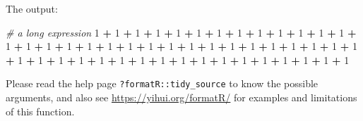 \documentclass[
  11pt,
]{krantz}
\newenvironment{Shaded}{\begin{snugshade}}{\end{snugshade}}
\newcommand{\CommentTok}[1]{\textcolor[rgb]{0.37,0.37,0.37}{\textit{#1}}}
\newcommand{\DecValTok}[1]{\textcolor[rgb]{0.06,0.06,0.06}{#1}}
\newcommand{\OperatorTok}[1]{\textcolor[rgb]{0.43,0.43,0.43}{\textbf{#1}}}
\newcommand{\StringTok}[1]{\textcolor[rgb]{0.5,0.5,0.5}{#1}}
\begin{document}
The output:

\begin{Shaded}
\begin{Highlighting}[]
\CommentTok{# a long expression}
\DecValTok{1} \OperatorTok{+}\StringTok{ }\DecValTok{1} \OperatorTok{+}\StringTok{ }\DecValTok{1} \OperatorTok{+}\StringTok{ }\DecValTok{1} \OperatorTok{+}\StringTok{ }\DecValTok{1} \OperatorTok{+}\StringTok{ }\DecValTok{1} \OperatorTok{+}\StringTok{ }\DecValTok{1} \OperatorTok{+}\StringTok{ }\DecValTok{1} \OperatorTok{+}\StringTok{ }\DecValTok{1} \OperatorTok{+}\StringTok{ }\DecValTok{1} \OperatorTok{+}\StringTok{ }\DecValTok{1} \OperatorTok{+}\StringTok{ }\DecValTok{1} \OperatorTok{+}\StringTok{ }\DecValTok{1} \OperatorTok{+}\StringTok{ }
\StringTok{  }\DecValTok{1} \OperatorTok{+}\StringTok{ }\DecValTok{1} \OperatorTok{+}\StringTok{ }\DecValTok{1} \OperatorTok{+}\StringTok{ }\DecValTok{1} \OperatorTok{+}\StringTok{ }\DecValTok{1} \OperatorTok{+}\StringTok{ }\DecValTok{1} \OperatorTok{+}\StringTok{ }\DecValTok{1} \OperatorTok{+}\StringTok{ }\DecValTok{1} \OperatorTok{+}\StringTok{ }\DecValTok{1} \OperatorTok{+}\StringTok{ }\DecValTok{1} \OperatorTok{+}\StringTok{ }\DecValTok{1} \OperatorTok{+}\StringTok{ }\DecValTok{1} \OperatorTok{+}\StringTok{ }
\StringTok{  }\DecValTok{1} \OperatorTok{+}\StringTok{ }\DecValTok{1} \OperatorTok{+}\StringTok{ }\DecValTok{1} \OperatorTok{+}\StringTok{ }\DecValTok{1} \OperatorTok{+}\StringTok{ }\DecValTok{1} \OperatorTok{+}\StringTok{ }\DecValTok{1} \OperatorTok{+}\StringTok{ }\DecValTok{1} \OperatorTok{+}\StringTok{ }\DecValTok{1} \OperatorTok{+}\StringTok{ }\DecValTok{1} \OperatorTok{+}\StringTok{ }\DecValTok{1} \OperatorTok{+}\StringTok{ }\DecValTok{1} \OperatorTok{+}\StringTok{ }\DecValTok{1} \OperatorTok{+}\StringTok{ }
\StringTok{  }\DecValTok{1} \OperatorTok{+}\StringTok{ }\DecValTok{1} \OperatorTok{+}\StringTok{ }\DecValTok{1} \OperatorTok{+}\StringTok{ }\DecValTok{1} \OperatorTok{+}\StringTok{ }\DecValTok{1} \OperatorTok{+}\StringTok{ }\DecValTok{1} \OperatorTok{+}\StringTok{ }\DecValTok{1} \OperatorTok{+}\StringTok{ }\DecValTok{1} \OperatorTok{+}\StringTok{ }\DecValTok{1} \OperatorTok{+}\StringTok{ }\DecValTok{1} \OperatorTok{+}\StringTok{ }\DecValTok{1}
\end{Highlighting}
\end{Shaded}

Please read the help page \texttt{?formatR::tidy\_source} to know the possible arguments, and also see \url{https://yihui.org/formatR/} for examples and limitations of this function.
\end{document}
